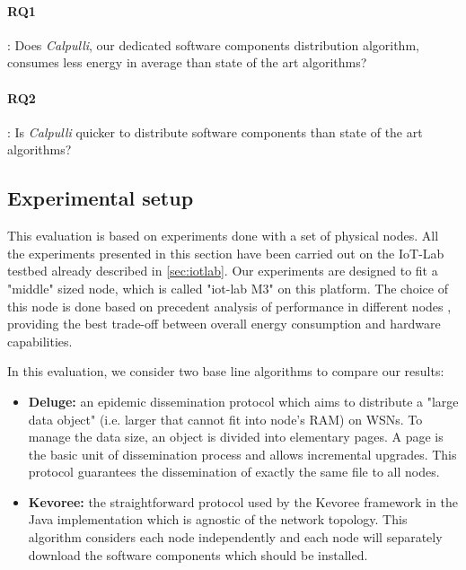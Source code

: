 \paragraph{RQ1}: Does \textit{Calpulli}, our dedicated software components distribution algorithm, consumes less energy in average than state of the art algorithms?

\paragraph{RQ2}: Is \textit{Calpulli} quicker to distribute software components than state of the art algorithms?

\subsection{Experimental setup}
This evaluation is based on experiments done with a set of physical nodes.
All the experiments presented in this section have been carried out on the IoT-Lab testbed\cite{Fleury15iotlab} already described in \ref{sec:iotlab}.
Our experiments are designed to fit a "middle" sized node, which is called "iot-lab M3" on this platform.
The choice of this node is done based on precedent analysis of performance in different nodes \cite{tsekoura2014evaluation}, providing the best trade-off between overall energy consumption and hardware capabilities.

In this evaluation, we consider two base line algorithms to compare our results:
\begin{itemize}
	\item \textbf{Deluge:} an epidemic dissemination protocol \cite{hui2004dynamic} which aims to distribute a "large data object" (i.e. larger that cannot fit into node's RAM) on WSNs. To manage the data size, an object is divided into elementary pages. A page is the basic unit of dissemination process and allows incremental upgrades. This protocol guarantees the dissemination of exactly the same file to all nodes.
	\item \textbf{Kevoree:} the straightforward protocol used by the Kevoree framework \cite{fouquet2013kevoree} in the Java implementation which is agnostic of the network topology. 
	This algorithm considers each node independently and each node will separately download the software components which should be installed.
\end{itemize}

